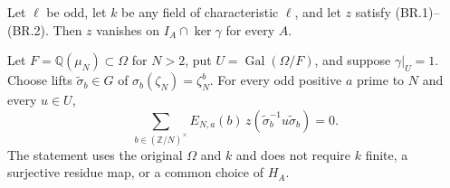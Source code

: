 \begin{proposition}
\label{prop:br-unramified}
Let $\ell$ be odd, let $k$ be any field of characteristic $\ell$,
and let $z$ satisfy (BR.1)--(BR.2).
Then $z$ vanishes on $I_A\cap\ker\gamma$ for every $A$.

Let $F=\mathbb Q(\mu_N)\subset\Omega$ for $N>2$, put
$U=\operatorname{Gal}(\Omega/F)$, and suppose $\gamma|_U=1$.
Choose lifts $\widetilde\sigma_b\in G$ of
$\sigma_b(\zeta_N)=\zeta_N^b$.
For every odd positive $a$ prime to $N$ and every $u\in U$,
\[
 \sum_{b\in(\mathbb Z/N)^\times}
 E_{N,a}(b)\,
 z(\widetilde\sigma_b^{-1}u\widetilde\sigma_b)=0.
 \tag{BR.27}
\]
The statement uses the original $\Omega$ and $k$ and does not require
$k$ finite, a surjective residue map, or a common choice of $H_A$.
\end{proposition}

